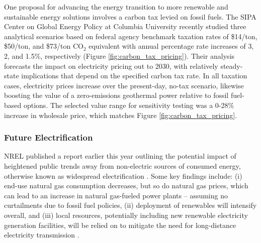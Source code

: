One proposal for advancing the energy transition to more renewable and sustainable energy solutions involves a carbon tax levied on fossil fuels. The SIPA Center on Global Energy Policy at Columbia University recently studied three analytical scenarios based on federal agency benchmark taxation rates of \$14/ton, \$50/ton, and \$73/ton CO$_2$ equivalent with annual percentage rate increases of 3, 2, and 1.5\%, respectively \citep{larson_energy_2018} (Figure \ref{fig:carbon_tax_pricing}). Their analysis forecasts the impact on electricity pricing out to 2030, with relatively steady-state implications that depend on the specified carbon tax rate. In all taxation cases, electricity prices increase over the present-day, no-tax scenario, likewise boosting the value of a zero-emissions geothermal power relative to fossil fuel-based options. The selected value range for sensitivity testing was a 0-28\% increase in wholesale price, which matches Figure \ref{fig:carbon_tax_pricing}.

\subsubsection{Future Electrification}
\label{ch4:future_elec}
NREL published a report earlier this year outlining the potential impact of heightened public trends away from non-electric sources of consumed energy, otherwise known as widespread electrification \citep{murphy_electrification_2021}. Some key findings include: (i) end-use natural gas consumption decreases, but so do natural gas prices, which can lead to an increase in natural gas-fueled power plants -- assuming no curtailments due to fossil fuel policies, (ii) deployment of renewables will intensify overall, and (iii) local resources, potentially including new renewable electricity generation facilities, will be relied on to mitigate the need for long-distance electricity transmission \citep{murphy_electrification_2021}.

